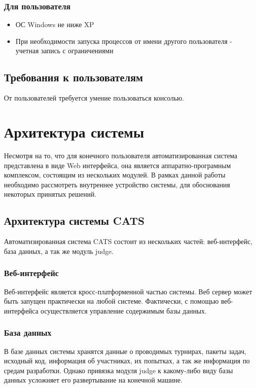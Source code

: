 \documentclass{imcs}
\begin{document}
\subsubsection{Для пользователя}
\begin{itemize}
  \item ОС Windows не ниже XP
  \item При необходимости запуска процессов от имени другого пользователя - учетная запись с ограничениями
\end{itemize}
    
\subsection{Требования к пользователям}
От пользователей требуется умение пользоваться консолью.

\section{Архитектура системы}

Несмотря на то, что для конечного пользователя автоматизированная система представлена в виде Web интерфейса, она является аппаратно-програмным комплексом, состоящим из нескольких модулей.
В рамках данной работы необходимо рассмотреть внутреннее устройство системы, для обоснования некоторых принятых решений.

\subsection{Архитектура системы CATS}
Автоматизированная система CATS состоит из нескольких частей: веб-интерфейс, база данных, а так же модуль judge. 


\subsubsection{Веб-интерфейс}
Веб-интерфейс\cite{rozhkov} является кросс-платформенной частью системы. Веб сервер может быть запущен практически на любой системе.
Фактически, с помощью веб-интерфейса осуществляется управление содержимым базы данных. 

\subsubsection{База данных}
\FloatBarrier
В базе данных\cite{rozhkov} системы хранятся данные о проводимых турнирах, пакеты задач, исходный код, информация об участниках, их попытках, а так же информация по средам разработки.
Однако привязка модуля judge к какому-либо виду базы данных усложняет его развертывание на конечной машине.
\end{document}

